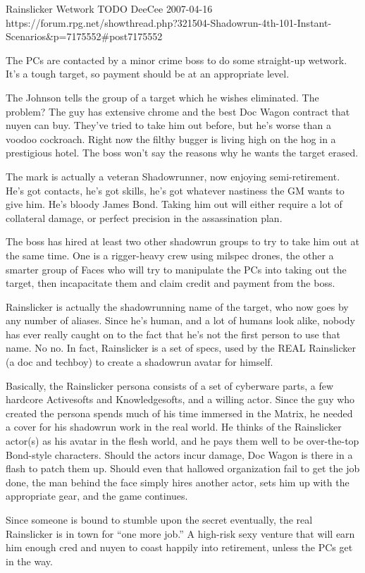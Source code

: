 \begin{scenario}{Rainslicker}
	{Wetwork}
	{TODO}
	{DeeCee}
	{2007-04-16}
	{https://forum.rpg.net/showthread.php?321504-Shadowrun-4th-101-Instant-Scenarios\&p=7175552#post7175552}

The PCs are contacted by a minor crime boss to do some straight-up wetwork. It's a tough target, so payment should be at an appropriate level.

\synopsis The Johnson tells the group of a target which he wishes eliminated. The problem? The guy has extensive chrome and the best Doc Wagon contract that nuyen can buy. They've tried to take him out before, but he's worse than a voodoo cockroach. Right now the filthy bugger is living high on the hog in a prestigious hotel. The boss won't say the reasons why he wants the target erased.

The mark is actually a veteran Shadowrunner, now enjoying semi-retirement. He's got contacts, he's got skills, he's got whatever nastiness the GM wants to give him. He's bloody James Bond. Taking him out will either require a lot of collateral damage, or perfect precision in the assassination plan.

\twist The boss has hired at least two other shadowrun groups to try to take him out at the same time. One is a rigger-heavy crew using milspec drones, the other a smarter group of Faces who will try to manipulate the PCs into taking out the target, then incapacitate them and claim credit and payment from the boss.

\notes Rainslicker is actually the shadowrunning name of the target, who now goes by any number of aliases. Since he's human, and a lot of humans look alike, nobody has ever really caught on to the fact that he's not the first person to use that name. No no. In fact, Rainslicker is a set of specs, used by the REAL Rainslicker (a doc and techboy) to create a shadowrun avatar for himself.

Basically, the Rainslicker persona consists of a set of cyberware parts, a few hardcore Activesofts and Knowledgesofts, and a willing actor. Since the guy who created the persona spends much of his time immersed in the Matrix, he needed a cover for his shadowrun work in the real world. He thinks of the Rainslicker actor(s) as his avatar in the flesh world, and he pays them well to be over-the-top Bond-style characters. Should the actors incur damage, Doc Wagon is there in a flash to patch them up. Should even that hallowed organization fail to get the job done, the man behind the face simply hires another actor, sets him up with the appropriate gear, and the game continues.

Since someone is bound to stumble upon the secret eventually, the real Rainslicker is in town for ``one more job.'' A high-risk sexy venture that will earn him enough cred and nuyen to coast happily into retirement, unless the PCs get in the way. 

\end{scenario}
